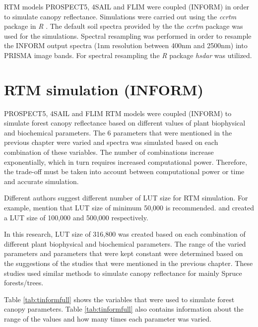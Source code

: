 \documentclass[a4paper, twoside]{templates/ociamthesis}
\begin{document}
RTM models PROSPECT5, 4SAIL and FLIM were coupled (INFORM) in order to simulate canopy reflectance. Simulations were carried out using the \emph{ccrtm} package \citep{ccrtm} in \emph{R} \citep{r}. The default soil spectra provided by the the \emph{ccrtm} package \citep{ccrtm} was used for the simulations. Spectral resampling was performed in order to resample the INFORM output spectra (1nm resolution between 400nm and 2500nm) into PRISMA image bands. For spectral resampling the \emph{R} package \emph{hsdar} \citep{hsdar} was utilized.

\hypertarget{rtm-simulation-inform}{%
\section{RTM simulation (INFORM)}\label{rtm-simulation-inform}}

PROSPECT5, 4SAIL and FLIM RTM models were coupled (INFORM) to simulate forest canopy reflectance based on different values of plant biophysical and biochemical parameters. The 6 parameters that were mentioned in the previous chapter were varied and spectra was simulated based on each combination of these variables. The number of combinations increase exponentially, which in turn requires increased computational power. Therefore, the trade-off must be taken into account between computational power or time and accurate simulation.

Different authors suggest different number of LUT size for RTM simulation. For example, \citet{danner2021efficient} mention that LUT size of minimum 50,000 is recommended. \citet{ali2020machine} and \citet{darvishzadeh2019mapping} created a LUT size of 100,000 and 500,000 respectively.

In this research, LUT size of 316,800 was created based on each combination of different plant biophysical and biochemical parameters. The range of the varied parameters and parameters that were kept constant were determined based on the suggestions of the studies that were mentioned in the previous chapter. These studies used similar methods to simulate canopy reflectance for mainly Spruce forests/trees.

Table \ref{tab:tinformfull} shows the variables that were used to simulate forest canopy parameters. Table \ref{tab:tinformfull} also contains information about the range of the values and how many times each parameter was varied.

\newpage
\end{document}
